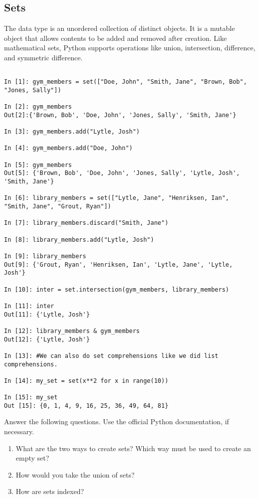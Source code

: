 \subsection*{Sets}
\begin{example}

The  data type is an unordered collection of distinct objects.
It is a mutable object that allows contents to be added and removed after creation. 
Like mathematical sets, Python supports operations like union, intersection, 
difference, and symmetric difference. 

\begin{lstlisting}

In [1]: gym_members = set(["Doe, John", "Smith, Jane", "Brown, Bob", "Jones, Sally"])

In [2]: gym_members
Out[2]:{'Brown, Bob', 'Doe, John', 'Jones, Sally', 'Smith, Jane'}

In [3]: gym_members.add("Lytle, Josh")

In [4]: gym_members.add("Doe, John")

In [5]: gym_members
Out[5]: {'Brown, Bob', 'Doe, John', 'Jones, Sally', 'Lytle, Josh', 'Smith, Jane'}

In [6]: library_members = set(["Lytle, Jane", "Henriksen, Ian", "Smith, Jane", "Grout, Ryan"])

In [7]: library_members.discard("Smith, Jane")

In [8]: library_members.add("Lytle, Josh") 

In [9]: library_members
Out[9]: {'Grout, Ryan', 'Henriksen, Ian', 'Lytle, Jane', 'Lytle, Josh'}

In [10]: inter = set.intersection(gym_members, library_members)

In [11]: inter
Out[11]: {'Lytle, Josh'}

In [12]: library_members & gym_members
Out[12]: {'Lytle, Josh'}

In [13]: #We can also do set comprehensions like we did list comprehensions.

In [14]: my_set = set(x**2 for x in range(10))

In [15]: my_set
Out [15]: {0, 1, 4, 9, 16, 25, 36, 49, 64, 81}

\end{lstlisting}
\end{example}

\begin{problem}
Answer the following questions. Use the official Python documentation, if necessary.
\begin{enumerate}
\item What are the two ways to create sets? Which way must be used to 
create an empty set?
\item How would you take the union of sets?
\item How are sets indexed?

\end{enumerate}
\end{problem}

